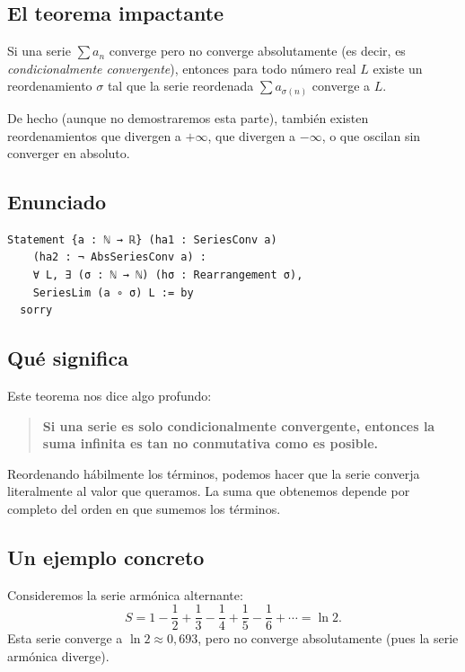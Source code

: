 \subsection{El teorema impactante}

\begin{teorema}
Si una serie $\sum a_n$ converge pero no converge absolutamente (es decir, es \emph{condicionalmente convergente}), entonces para todo número real $L$ existe un reordenamiento $\sigma$ tal que la serie reordenada $\sum a_{\sigma(n)}$ converge a $L$.
\end{teorema}

De hecho (aunque no demostraremos esta parte), también existen reordenamientos que divergen a $+\infty$, que divergen a $-\infty$, o que oscilan sin converger en absoluto.

\subsection{Enunciado}

\begin{verbatim}
Statement {a : ℕ → ℝ} (ha1 : SeriesConv a)
    (ha2 : ¬ AbsSeriesConv a) :
    ∀ L, ∃ (σ : ℕ → ℕ) (hσ : Rearrangement σ),
    SeriesLim (a ∘ σ) L := by
  sorry
\end{verbatim}

\subsection{Qué significa}

Este teorema nos dice algo profundo:

\begin{quote}
\textbf{Si una serie es solo condicionalmente convergente, entonces la suma infinita es tan no conmutativa como es posible.}
\end{quote}

Reordenando hábilmente los términos, podemos hacer que la serie converja literalmente al valor que queramos. La suma que obtenemos depende por completo del orden en que sumemos los términos.

\subsection{Un ejemplo concreto}

Consideremos la serie armónica alternante:
\[
  S = 1 - \frac12 + \frac13 - \frac14 + \frac15 - \frac16 + \cdots = \ln 2 .
\]
Esta serie converge a $\ln 2 \approx 0{,}693$, pero no converge absolutamente (pues la serie armónica diverge).


